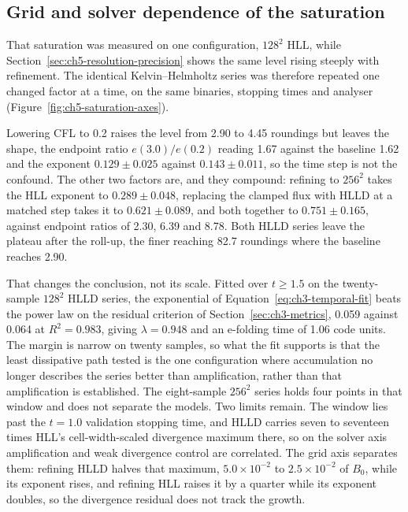 \subsection{Grid and solver dependence of the saturation}
\label{sec:ch5-saturation-axes}

That saturation was measured on one configuration, $128^2$ HLL, while
Section~\ref{sec:ch5-resolution-precision} shows the same level rising steeply
with refinement. The identical Kelvin--Helmholtz series was therefore repeated
one changed factor at a time, on the same binaries, stopping times and analyser
(Figure~\ref{fig:ch5-saturation-axes}).

Lowering CFL to 0.2 raises the level from 2.90 to 4.45 roundings but leaves the
shape, the endpoint ratio $e(3.0)/e(0.2)$ reading 1.67 against the baseline 1.62
and the exponent $0.129\pm0.025$ against $0.143\pm0.011$, so the time step is
not the confound. The other two factors are, and they compound: refining to
$256^2$ takes the HLL exponent to $0.289\pm0.048$, replacing the clamped flux
with HLLD at a matched step takes it to $0.621\pm0.089$, and both together to
$0.751\pm0.165$, against endpoint ratios of 2.30, 6.39 and 8.78. Both HLLD
series leave the plateau after the roll-up, the finer reaching 82.7 roundings
where the baseline reaches 2.90.

That changes the conclusion, not its scale. Fitted over $t\geq1.5$ on the
twenty-sample $128^2$ HLLD series, the exponential of
Equation~\ref{eq:ch3-temporal-fit} beats the power law on the residual
criterion of Section~\ref{sec:ch3-metrics}, 0.059 against 0.064 at $R^2=0.983$,
giving $\lambda=0.948$ and an e-folding time of 1.06 code units. The margin is
narrow on twenty samples, so what the fit supports is that the least dissipative
path tested is the one configuration where accumulation no longer describes the
series better than amplification, rather than that amplification is established.
The eight-sample $256^2$ series holds four points in that window and does not
separate the models. Two limits remain. The window lies past the $t=1.0$
validation stopping time, and HLLD carries seven to seventeen times HLL's
cell-width-scaled divergence maximum there, so on the solver axis amplification
and weak divergence control are correlated. The grid axis separates them:
refining HLLD halves that maximum, $5.0\times10^{-2}$ to $2.5\times10^{-2}$ of
$B_0$, while its exponent rises, and refining HLL raises it by a quarter while
its exponent doubles, so the divergence residual does not track the growth.

